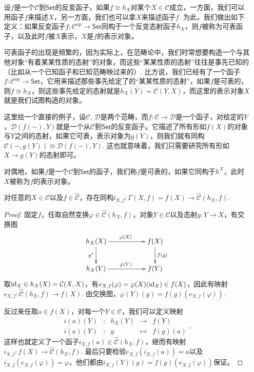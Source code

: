 设$f$是一个$\mathcal{C}$到$\mathsf{Set}$的反变函子，如果$f\cong h_X$对某个$X\in \mathcal{C}$成立，一方面，我们可以用函子$f$来描述$X$，另一方面，我们也可以拿$X$来描述函子$f$. 为此，我们做出如下定义：如果反变函子$f:\mathcal{C}^{\text{op}}\to \mathsf{Set}$同构于一个反变态射函子$h_X$，则$f$被称为可表函子，以及此时$f$被$X$表示，$X$是$f$的表示对象。

可表函子的出现是频繁的，因为实际上，在范畴论中，我们时常想要构造一个与其他对象“有着某某性质的态射”的对象，而这些“某某性质的态射”往往是事先已知的（比如从一个已知函子和已知范畴映过来的）. 比方说，我们已经有了一个函子$f:\mathcal{C}^\text{op}\to\mathsf{Set}$，它用来描述那些事先给定了的“某某性质的态射”，如果$f$是可表的，则$f\cong h_X$，则这些事先给定的态射就是$h_X(Y)=\mathcal{C}(Y,X)$，而这里的表示对象$X$就是我们试图构造的对象。

这里给一个直接的例子，设$\mathcal{C}$, $\mathcal{D}$是两个范畴，而$f:\mathcal{C}\to \mathcal{D}$是一个函子，对给定的$Y$，$\mathcal{D}(f(-),Y)$就是一个从$\mathcal{C}$到$\mathsf{Set}$的反变函子。它描述了所有形如$f(X)$的对象与$Y$之间的态射，如果它可表，表示对象为$g(Y)$，则我们就有同构$\mathcal{C}(-,g(Y))\cong \mathcal{D}(f(-),Y)$. 这也就意味着，我们只需要研究所有形如$X\to g(Y)$的态射即可。

对偶地，如果$f$是一个$\mathcal{C}$到$\mathsf{Set}$的函子，我们称$f$是可表的，如果它同构于$h^X$，此时$X$被称为$f$的表示对象。

\begin{lem}
对任意的$X\in \mathcal{C}$以及$f\in \hat{\mathcal{C}}$，存在同构$i_{X,f}:\Gamma(X,f)=f(X)\to {\hat{\mathcal{C}}}(h_X,f)$.
\end{lem}

\begin{proof}
	固定$f$，任取自然变换$\varphi\in {\hat{\mathcal{C}}}(h_X,f)$，对象$Y\in\mathcal{C}$以及态射$g:Y\to X$，有交换图
	\[
	\begin{xy}
		\xymatrix{
			h_X(X)\ar[rr]^{\varphi(X)} \ar[d]_{g^*}&&f(X) \ar[d]^{f(g)}\\
			h_X(Y)\ar[rr]^{\varphi(Y)}&&f(Y)
		}
	\end{xy}
	\]
	取$\operatorname{id}_X\in h_X(X)=\mathcal{C}(X,X)$，有$e_{X,f}(\varphi)=\varphi(X)(\operatorname{id}_X)\in f(X)$，因此有映射$e_{X,f}:{\hat{\mathcal{C}}}(h_X,f)\to f(X)$. 由交换图，$\varphi(Y)(g)=f(g)\left(e_{X,f}(\varphi)\right)$.

	反过来任取$a\in f(X)$，对每一个$Y\in\mathcal{C}$，我们可以定义映射
	\[
	\begin{array}{ccccc}
	i(a)(Y)&:&h_X(Y)&\to &f(Y)\\
	i(a)(Y)&:&g&\mapsto&f(g)(a)
	\end{array},
	\]
	这样也就定义了一个函子$i_{X,f}(a)\in {\hat{\mathcal{C}}}(h_X,f)$，继而有映射$i_{X,f}:f(X)\to {\hat{\mathcal{C}}}(h_X,f)$. 最后只要检验$e_{X,f}(i_{X,f}(a))=a$以及$i_{X,f}(e_{X,f}(\varphi))=\varphi$，他们都由$i_{X,f}(Y)(g)=f(g)\left(e_{X,f}(\varphi)\right)$保证。
\end{proof}

